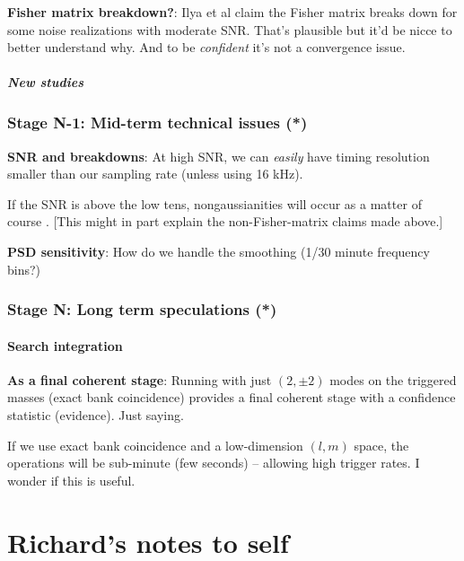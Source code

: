 \documentclass[twocolumn,prd,nofootinbib]{revtex4}
\newcommand\editremark[1]{{\color{red} #1}}
\begin{document}
\noindent \textbf{Fisher matrix breakdown?}: Ilya et al claim the Fisher matrix breaks down for some noise realizations
with moderate SNR.  That's plausible but it'd be nicce to better understand why.  And to be \emph{confident} it's not a
convergence issue.

\subsubsection{New studies}



\section{Stage N-1: Mid-term technical issues (*)}

\noindent \textbf{SNR and breakdowns}: At high SNR, we can \emph{easily} have timing resolution smaller than our
sampling rate (unless using 16 kHz). 

If the SNR is above the low tens, nongaussianities will occur as a matter of course .  [This might in part explain the
  non-Fisher-matrix claims made above.]

\noindent \textbf{PSD sensitivity}: How do we handle the smoothing (1/30 minute  frequency bins?)



\section{Stage N: Long term speculations (*)}


\subsection{Search integration}

\noindent \textbf{As a final coherent stage}: Running with just $(2,\pm 2)$ modes on the triggered masses (exact bank
coincidence) provides a final coherent stage with a confidence statistic (evidence).  Just saying.

If we use exact bank coincidence and a low-dimension $(l,m)$ space, the operations will be sub-minute (few seconds) --
allowing high trigger rates. \editremark{I wonder if this is useful}.



\part{Richard's notes to self}
\end{document}
